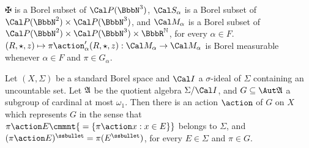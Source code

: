  $\maltese$ is a Borel subset of $\Cal P(\BbbN^3)$,
$\Cal S_{\alpha}$ is a Borel subset of
$\Cal P(\BbbN^2)\times\Cal P(\BbbN^3)$,
and $\Cal M_{\alpha}$ is a Borel subset of
$\Cal P(\BbbN^2)\times\Cal P(\BbbN^3)\times\BbbR^{\Bbb N}$, for every
$\alpha\in F$.   
$(R,\star,z)\mapsto\pi\action'_{\alpha}(R,\star,z):
  \Cal M_{\alpha}\to\Cal M_{\alpha}$ is Borel
measurable whenever $\alpha\in F$ and $\pi\in G_{\alpha}$.

Let $(X,\Sigma)$ be a standard Borel space and
$\Cal I$ a $\sigma$-ideal of $\Sigma$ containing an uncountable
set.   Let $\frak A$ be the quotient algebra $\Sigma/\Cal I$, and
$G\subseteq\Aut\frak A$ a subgroup of cardinal at most $\omega_1$.
Then there is an action $\action$ of $G$ on $X$ which represents $G$ in the
sense that $\pi\action E\cmmnt{\mskip5mu=\{\pi\action x:x\in E\}}$
belongs to $\Sigma$, and
$(\pi\action E)^{\ssbullet}=\pi(E^{\ssbullet})$,
for every $E\in\Sigma$ and $\pi\in G$.

